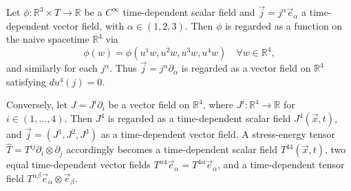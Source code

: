 Let $\phi: \mathbb{R}^3 \times T \to \mathbb{R}$ be a $C^\infty$ time-dependent scalar field and $\vec{j} = j^\alpha \vec{e}_\alpha$ a time-dependent vector field, with $\alpha \in (1,2,3)$. Then $\phi$ is regarded as a function on the naive spacetime $\mathbb{R}^4$ via
$$
\phi(w) = \phi(u^1 w, u^2 w, u^3 w, u^4 w) \quad \forall w \in \mathbb{R}^4,
$$
and similarly for each $j^\alpha$. Thus $\vec{j} = j^\alpha \partial_\alpha$ is regarded as a vector field on $\mathbb{R}^4$ satisfying $du^4(j) = 0$.

Conversely, let $J = J^i \partial_i$ be a vector field on $\mathbb{R}^4$, where $J^i: \mathbb{R}^4 \to \mathbb{R}$ for $i \in (1,\dots,4)$. Then $J^4$ is regarded as a time-dependent scalar field $J^4(\vec{x}, t)$, and $\vec{j} = (J^1, J^2, J^3)$ as a time-dependent vector field. A stress-energy tensor $\hat{T} = T^{ij} \partial_i \otimes \partial_j$ accordingly becomes a time-dependent scalar field $T^{44}(\vec{x},t)$, two equal time-dependent vector fields $T^{\alpha 4} \vec{e}_\alpha = T^{4\alpha} \vec{e}_\alpha$, and a time-dependent tensor field $T^{\alpha\beta} \vec{e}_\alpha \otimes \vec{e}_\beta$.
